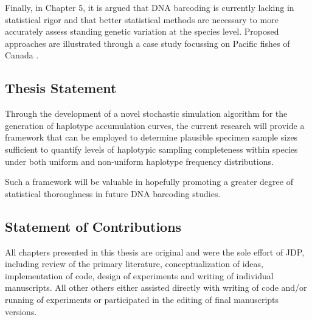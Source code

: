 \vspace{5mm}

Finally, in Chapter 5, it is argued that DNA barcoding is currently lacking in statistical rigor and that better statistical methods are necessary to more accurately assess standing genetic variation at the species level. Proposed approaches are illustrated through a case study focussing on Pacific fishes of Canada \cite{steinke2009dna}.

\vspace{5mm}

\subsection{Thesis Statement}

Through the development of a novel stochastic simulation algorithm for the generation of haplotype accumulation curves, the current research will provide a framework that can be employed to determine plausible specimen sample sizes sufficient to quantify levels of haplotypic sampling completeness within species under both uniform and non-uniform haplotype frequency distributions.

\vspace{5mm}

Such a framework will be valuable in hopefully promoting a greater degree of statistical thoroughness in future DNA barcoding studies. 


\subsection{Statement of Contributions}
  
All chapters presented in this thesis are original and were the sole effort of JDP, \\ including review of the primary literature, conceptualization of ideas, implementation of code, design of experiments and writing of individual manuscripts. All other others either assisted directly with writing of code and/or running of experiments or participated in the editing of final manuscripts versions.